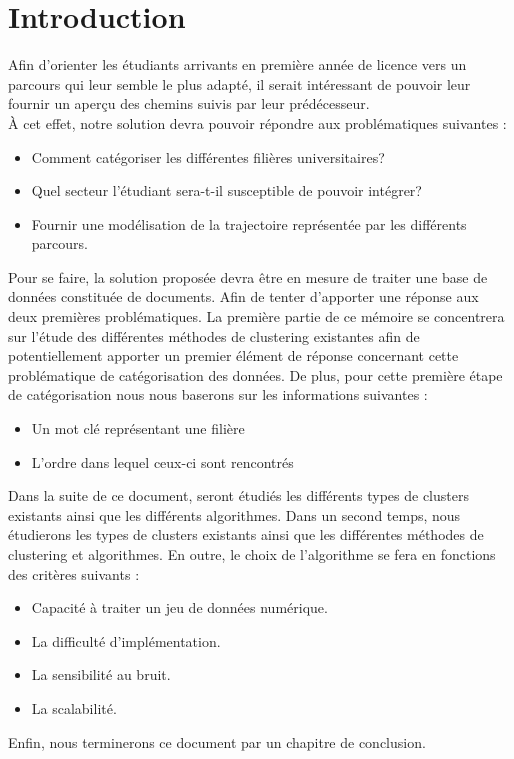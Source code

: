 \documentclass[memoire.tex]{subfiles}
\begin{document}
\chapter*{Introduction}
Afin d'orienter les étudiants arrivants en première année de licence vers un parcours qui leur semble le plus adapté, il serait intéressant de pouvoir leur fournir un aperçu des chemins suivis par leur prédécesseur.\\
À cet effet, notre solution devra pouvoir répondre aux problématiques suivantes : 
\begin{itemize}
\item Comment catégoriser les différentes filières universitaires?
\item Quel secteur l'étudiant sera-t-il susceptible de pouvoir intégrer?
\item Fournir une modélisation de la trajectoire représentée par les différents parcours.
\end{itemize}
Pour se faire, la solution proposée devra être en mesure de traiter une base de données constituée de documents. Afin de tenter d'apporter une réponse aux deux premières problématiques. La première partie de ce mémoire se concentrera sur l'étude des différentes méthodes de clustering existantes afin de potentiellement apporter un premier élément de réponse concernant cette problématique de catégorisation des données. De plus, pour cette première étape de catégorisation nous nous baserons sur les informations suivantes : \begin{itemize}
\item Un mot clé représentant une filière
\item L'ordre dans lequel ceux-ci sont rencontrés
\end{itemize}
Dans la suite de ce document, seront étudiés les différents types de clusters existants ainsi que les différents algorithmes. Dans un second temps, nous étudierons les types de clusters existants ainsi que les différentes méthodes de clustering et algorithmes. En outre, le choix de l'algorithme se fera en fonctions des critères suivants : \begin{itemize}
\item Capacité à traiter un jeu de données numérique.
\item La difficulté d'implémentation.
\item La sensibilité au bruit.
\item La scalabilité.
\end{itemize} Enfin, nous terminerons ce document par un chapitre de conclusion.\\
\end{document}
